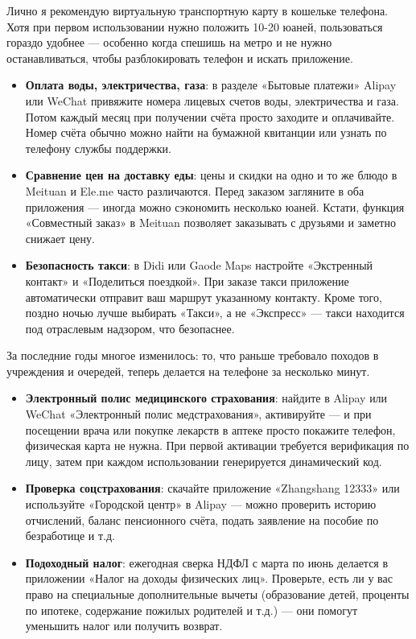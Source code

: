 Лично я рекомендую виртуальную транспортную карту в кошельке телефона. Хотя при первом использовании нужно положить 10-20 юаней, пользоваться гораздо удобнее — особенно когда спешишь на метро и не нужно останавливаться, чтобы разблокировать телефон и искать приложение.


\begin{itemize}
  \item \textbf{Оплата воды, электричества, газа}: в разделе «Бытовые платежи» Alipay или WeChat привяжите номера лицевых счетов воды, электричества и газа. Потом каждый месяц при получении счёта просто заходите и оплачивайте. Номер счёта обычно можно найти на бумажной квитанции или узнать по телефону службы поддержки.
  \item \textbf{Сравнение цен на доставку еды}: цены и скидки на одно и то же блюдо в Meituan и Ele.me часто различаются. Перед заказом загляните в оба приложения — иногда можно сэкономить несколько юаней. Кстати, функция «Совместный заказ» в Meituan позволяет заказывать с друзьями и заметно снижает цену.
  \item \textbf{Безопасность такси}: в Didi или Gaode Maps настройте «Экстренный контакт» и «Поделиться поездкой». При заказе такси приложение автоматически отправит ваш маршрут указанному контакту. Кроме того, поздно ночью лучше выбирать «Такси», а не «Экспресс» — такси находится под отраслевым надзором, что безопаснее.
\end{itemize}


За последние годы многое изменилось: то, что раньше требовало походов в учреждения и очередей, теперь делается на телефоне за несколько минут.

\begin{itemize}
  \item \textbf{Электронный полис медицинского страхования}: найдите в Alipay или WeChat «Электронный полис медстрахования», активируйте — и при посещении врача или покупке лекарств в аптеке просто покажите телефон, физическая карта не нужна. При первой активации требуется верификация по лицу, затем при каждом использовании генерируется динамический код.
  \item \textbf{Проверка соцстрахования}: скачайте приложение «Zhangshang 12333» или используйте «Городской центр» в Alipay — можно проверить историю отчислений, баланс пенсионного счёта, подать заявление на пособие по безработице и т.д.
  \item \textbf{Подоходный налог}: ежегодная сверка НДФЛ с марта по июнь делается в приложении «Налог на доходы физических лиц». Проверьте, есть ли у вас право на специальные дополнительные вычеты (образование детей, проценты по ипотеке, содержание пожилых родителей и т.д.) — они помогут уменьшить налог или получить возврат.
\end{itemize}

